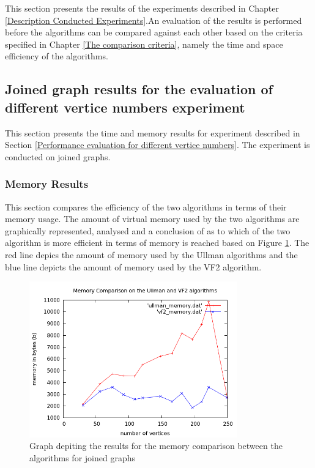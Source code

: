 \label{Experiment Results}
This section presents the results of the experiments described in Chapter \ref{Description Conducted Experiments}.An evaluation of the results is
performed before the algorithms can be compared against each other based on the criteria specified in Chapter \ref{The comparison criteria}, namely the time and 
space efficiency of the algorithms.

\subsection{Joined graph results for the evaluation of different vertice numbers experiment}
This section presents the time and memory results for experiment described in Section \ref{Performance evaluation for different vertice numbers}. The 
experiment is conducted on joined graphs.
\subsubsection{Memory Results}
\label{Memory Results}
This section compares the efficiency of the two algorithms in terms of their memory usage. The amount of virtual memory used by the two algorithms are graphically 
represented, analysed and a conclusion of as to which of the two algorithm is more efficient in terms of memory is reached based on Figure \ref{fig:memory_comparison}.
The red line depics the amount of memory used by the Ullman algorithms and the blue line depicts the amount of memory used by the VF2 algorithm.
\begin{figure}[H]
  \begin{center}
      \includegraphics[width=0.8\textwidth]{memory_comparison.png}
  \end{center}    
  \caption{Graph depiting the results for the memory comparison between the algorithms for joined graphs}
  \label{fig:memory_comparison}
\end{figure}

